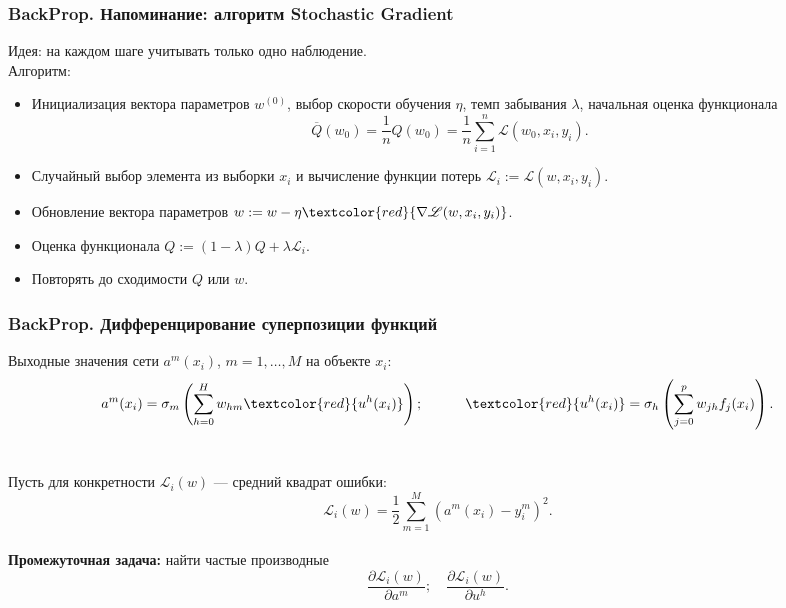 \documentclass[10pt]{beamer}
\begin{document}
\begin{frame}
\frametitle{BackProp. Напоминание: алгоритм Stochastic Gradient}

Идея: на каждом шаге учитывать только одно наблюдение. \\
	\vspace{0.4cm} 
	Алгоритм: \\
	\vspace{0.2cm} 
	\begin{itemize}
		\item Инициализация вектора параметров $w^{(0)}$, выбор скорости обучения $\eta$, темп забывания $\lambda$, начальная оценка функционала 
		$$\overline{Q}(w_0)=\frac{1}{n} Q(w_0)=\frac{1}{n} \sum_{i=1}^n \mathscr{L}(w_0,x_i,y_i).$$
		\item Случайный выбор элемента из выборки $x_i$ и вычисление функции потерь $\mathscr{L}_i:=\mathscr{L}(w,x_i,y_i)$.
		\item Обновление вектора параметров $w:=w- \eta \textcolor{red}{\nabla \mathscr{L}(w,x_i,y_i)}$.
		\item Оценка функционала $Q :=(1-\lambda)Q+\lambda \mathscr{L}_i$.
		\item Повторять до сходимости $Q$ или $w$.
	\end{itemize}

\end{frame} 

\begin{frame}
\frametitle{BackProp. Дифференцирование суперпозиции функций}
Выходные значения сети $a^m(x_i)$, $m=1,\ldots,M$ на объекте $x_i$:
\begin{equation*}
 a^m(x_i) = \sigma_m \left(\sum_{h=0}^{H} w_{hm}  \textcolor{red}{ u^h(x_i)}  \right); \quad \quad \quad 
 \textcolor{red}{ u^h(x_i)} = \sigma_h \left(\sum_{j=0}^{p} w_{jh} f_j(x_{i})   \right).
\end{equation*} \\
	\vspace{0.4cm} 

Пусть для конкретности $\mathscr{L}_i(w)$ --- средний квадрат ошибки:
\begin{equation*}
\mathscr{L}_i(w) = \frac{1}{2} \sum_{m=1}^{M}(a^m(x_i) - y^m_i)^2.
\end{equation*}\\
	\vspace{0.4cm} 
\textbf{Промежуточная задача:} найти частые производные 
\begin{equation*}
 \frac{\partial \mathscr{L}_i(w)}{\partial a^m}; \quad \frac{\partial \mathscr{L}_i(w)}{\partial u^h}.
\end{equation*} \\
\end{frame} 
\end{document}
